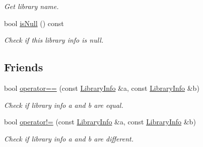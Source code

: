 \begin{DoxyCompactItemize}
\begin{DoxyCompactList}\small\item\em Get library name. \end{DoxyCompactList}\item 
bool \hyperlink{class_mdt_1_1_deploy_utils_1_1_library_info_a4a48fdaaeb10412441f4e1edddfd1026}{is\+Null} () const \hypertarget{class_mdt_1_1_deploy_utils_1_1_library_info_a4a48fdaaeb10412441f4e1edddfd1026}{}\label{class_mdt_1_1_deploy_utils_1_1_library_info_a4a48fdaaeb10412441f4e1edddfd1026}

\begin{DoxyCompactList}\small\item\em Check if this library info is null. \end{DoxyCompactList}\end{DoxyCompactItemize}
\subsection*{Friends}
\begin{DoxyCompactItemize}
\item 
bool \hyperlink{class_mdt_1_1_deploy_utils_1_1_library_info_ac6f255170448e5789db860534a4eddbe}{operator==} (const \hyperlink{class_mdt_1_1_deploy_utils_1_1_library_info}{Library\+Info} \&a, const \hyperlink{class_mdt_1_1_deploy_utils_1_1_library_info}{Library\+Info} \&b)\hypertarget{class_mdt_1_1_deploy_utils_1_1_library_info_ac6f255170448e5789db860534a4eddbe}{}\label{class_mdt_1_1_deploy_utils_1_1_library_info_ac6f255170448e5789db860534a4eddbe}

\begin{DoxyCompactList}\small\item\em Check if library info a and b are equal. \end{DoxyCompactList}\item 
bool \hyperlink{class_mdt_1_1_deploy_utils_1_1_library_info_a4888aa068e25a386597525dabcbdbb97}{operator!=} (const \hyperlink{class_mdt_1_1_deploy_utils_1_1_library_info}{Library\+Info} \&a, const \hyperlink{class_mdt_1_1_deploy_utils_1_1_library_info}{Library\+Info} \&b)\hypertarget{class_mdt_1_1_deploy_utils_1_1_library_info_a4888aa068e25a386597525dabcbdbb97}{}\label{class_mdt_1_1_deploy_utils_1_1_library_info_a4888aa068e25a386597525dabcbdbb97}

\begin{DoxyCompactList}\small\item\em Check if library info a and b are different. \end{DoxyCompactList}\end{DoxyCompactItemize}


